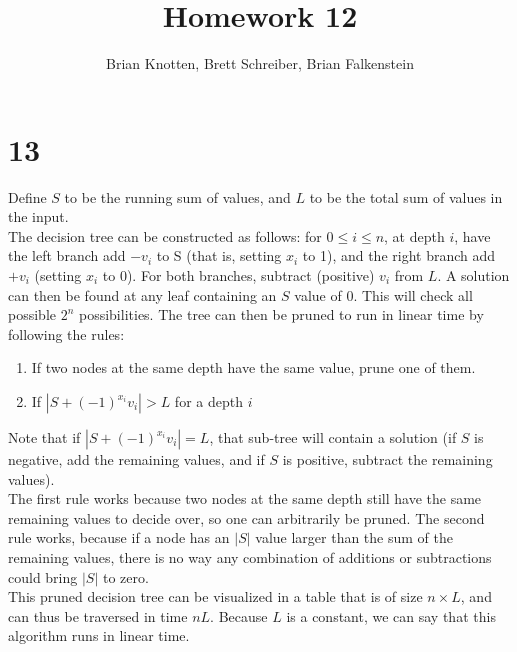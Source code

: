 \documentclass[letterpaper,notitlepage,twoside]{article}
\begin{document}
\title{Homework 12}
\author{Brian Knotten, Brett Schreiber, Brian Falkenstein}
\maketitle

\section*{13}
Define $S$ to be the running sum of values, and $L$ to be the total sum of values in the input.\\
The decision tree can be constructed as follows: for $0\leq i \leq n$, at depth $i$, have the left branch add $-v_i$ to S (that is, setting $x_i$ to 1), and the right branch add $+v_i$ (setting $x_i$ to 0). For both branches, subtract (positive) $v_i$ from $L$. A solution can then be found at any leaf containing an $S$ value of 0. This will check all possible $2^n$ possibilities. The tree can then be pruned to run in linear time by following the rules: 
\begin{enumerate}
\item If two nodes at the same depth have the same value, prune one of them. 
\item If $|S+(-1)^{x_i} v_i| > L$ for a depth $i$ 
\end{enumerate}
Note that if $|S+(-1)^{x_i} v_i| = L$, that sub-tree will contain a solution (if $S$ is negative, add the remaining values, and if $S$ is positive, subtract the remaining values). \\
The first rule works because two nodes at the same depth still have the same remaining values to decide over, so one can arbitrarily be pruned. The second rule works, because if a node has an $|S|$ value larger than the sum of the remaining values, there is no way any combination of additions or subtractions could bring $|S|$ to zero. \\
This pruned decision tree can be visualized in a table that is of size $n\times L$, and can thus be traversed in time $nL$. Because $L$ is a constant, we can say that this algorithm runs in linear time. 
\end{document}

